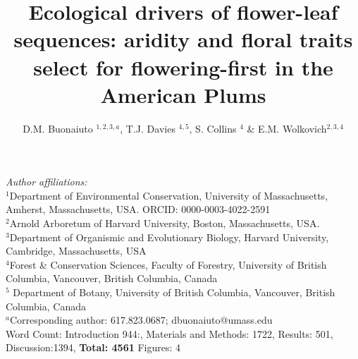 \documentclass{article}[12pt]
\title{Ecological drivers of flower-leaf sequences: aridity and floral traits select for flowering-first in the American Plums}
\author{D.M. Buonaiuto $^{1,2,3,a}$, T.J. Davies $^{4,5}$, S. Collins $^{4}$ \& E.M. Wolkovich$^{2,3,4}$}
\date{}
\begin{document}

\maketitle
 \noindent \emph{Author affiliations:}\\
\noindent $^1$Department of Environmental Conservation, University of Massachusetts, Amherst, Massachusetts, USA. ORCID: 0000-0003-4022-2591\\
\noindent 
$^2$Arnold Arboretum of Harvard University, Boston, Massachusetts, USA.\\
$^3$Department of Organismic and Evolutionary Biology, Harvard University, Cambridge, Massachusetts, USA \\
$^4$Forest \& Conservation Sciences, Faculty of Forestry, University of British Columbia, Vancouver, British Columbia, Canada\\
$^5$ Department of Botany, University of British Columbia, Vancouver, British Columbia, Canada\\
$^a$Corresponding author: 617.823.0687; dbuonaiuto@umass.edu\\

Word Count: Introduction 944:, Materials and Methods: 1722, Results: 501, Discussion:1394, \textbf{Total: 4561}
Figures: 4\\

\pagebreak
\end{document}
